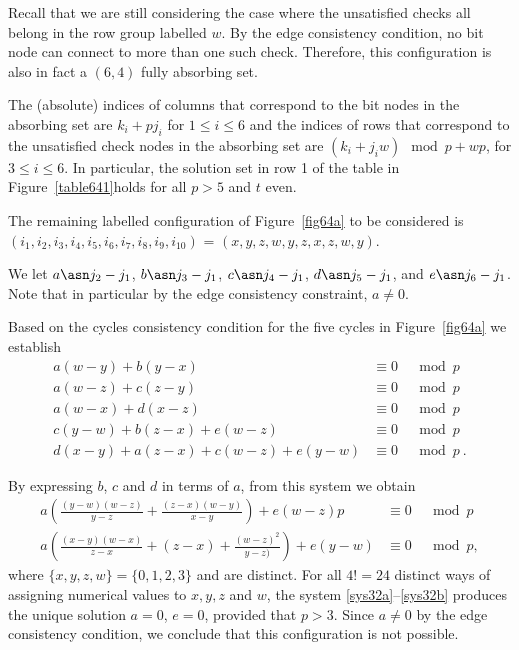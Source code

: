 Recall that we are still considering the case where the
unsatisfied checks all belong in the row group labelled $w$. By
the edge consistency condition, no bit node can connect to more
than one such check. Therefore, this configuration is also in fact
a $(6,4)$ fully absorbing set.

The (absolute) indices of columns that correspond to the bit nodes
in the absorbing set are $k_i+pj_i$ for $1 \leq i \leq 6$ and the
indices of rows that correspond to the unsatisfied check nodes in
the absorbing set are $(k_i+j_iw) \mod p+ wp$, for $3\leq i \leq
6$. In particular, the solution set in row 1 of the table in
Figure~\ref{table641}holds for all $p
> 5$ and $t$ even.


 The remaining labelled configuration of Figure~\ref{fig64a} to be considered is
$(i_1,i_2,i_3,i_4,i_5,i_6,i_7,i_8,i_9,i_{10})$ =
$(x,y,z,w,y,z,x,z,w,y)$.

We let $a \asn j_2-j_1$, $b \asn j_3-j_1$, $c \asn j_4-j_1$,
 $d \asn j_5-j_1$, and $e \asn j_6-j_1$.  Note that in particular
 by the edge consistency constraint, $a \neq 0$.

Based on the cycles consistency condition for the five cycles in
Figure~\ref{fig64a} we establish
 \begin{equation}\label{sys31}\begin{array}{cccc}
 a(w-y)+b(y-x) &\equiv 0 &\mod p\\
 a(w-z)+c(z-y) &\equiv 0 &\mod p\\
 a(w-x)+d(x-z) &\equiv 0 &\mod p\\
 c(y-w)+b(z-x)+e(w-z) &\equiv 0 &\mod p\\
 d(x-y)+a(z-x)+c(w-z)+e(y-w)&\equiv 0 &\mod p~.
 \end{array}
 \end{equation}



By expressing $b$, $c$ and $d$ in terms of $a$, from this system
we obtain
\begin{eqnarray}\label{sys32a}
a\left(\frac{(y-w)(w-z)}{y-z}+\frac{(z-x)(w-y)}{x-y} \right)+e(w-z)p &\equiv 0 &\mod p\\
\label{sys32b}a\left(\frac{(x-y)(w-x)}{z-x}+(z-x)+\frac{(w-z)^2}{y-z)}
\right)+e(y-w)&\equiv 0 &\mod p,
\end{eqnarray}
where $\{x,y,z,w\} =\{0,1,2,3\}$ and are distinct. For all $4!=24$
distinct ways of assigning numerical values to $x,y,z$ and $w$,
the system \eqref{sys32a}--\eqref{sys32b} produces the unique
solution $a=0$, $e=0$, provided that $p>3$. Since $a\neq 0$ by the
edge consistency condition, we conclude that this configuration is
not possible.

